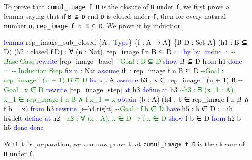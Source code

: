 \documentclass[
  letterpaper,
  DIV=11,
  numbers=noendperiod]{scrreprt}
\newenvironment{Shaded}{\begin{snugshade}}{\end{snugshade}}
\newcommand{\CommentTok}[1]{\textcolor[rgb]{0.37,0.37,0.37}{#1}}
\newcommand{\KeywordTok}[1]{\textcolor[rgb]{0.00,0.23,0.31}{#1}}
\newcommand{\NormalTok}[1]{\textcolor[rgb]{0.00,0.23,0.31}{#1}}
\renewcommand{\NormalTok}[1]{\textcolor[HTML]{000000}{#1}}
\renewcommand{\KeywordTok}[1]{\textcolor[HTML]{0000FF}{#1}}
\renewcommand{\CommentTok}[1]{\textcolor[HTML]{008000}{#1}}
\theoremstyle{remark}
\begin{document}
To prove that \texttt{cumul\_image\ f\ B} is the closure of \texttt{B}
under \texttt{f}, we first prove a lemma saying that if \texttt{B\ ⊆\ D}
and \texttt{D} is closed under \texttt{f}, then for every natural number
\texttt{n}, \texttt{rep\_image\ f\ n\ B\ ⊆\ D}. We prove it by
induction.

\begin{Shaded}
\begin{Highlighting}[]
\KeywordTok{lemma}\NormalTok{ rep\_image\_sub\_closed \{A : }\KeywordTok{Type}\NormalTok{\} \{f : A → A\} \{B D : Set A\}}
\NormalTok{    (h1 : B ⊆ D) (h2 : closed f D) :}
\NormalTok{    ∀ (n : Nat), rep\_image f n B ⊆ D := }\KeywordTok{by}
  \KeywordTok{by\_induc}
\NormalTok{  · }\CommentTok{{-}{-} Base Case}
    \KeywordTok{rewrite}\NormalTok{ [rep\_image\_base]          }\CommentTok{{-}{-}Goal : B ⊆ D}
    \KeywordTok{show}\NormalTok{ B ⊆ D }\KeywordTok{from}\NormalTok{ h1}
    \KeywordTok{done}
\NormalTok{  · }\CommentTok{{-}{-} Induction Step}
    \KeywordTok{fix}\NormalTok{ n : Nat}
    \KeywordTok{assume}\NormalTok{ ih : rep\_image f n B ⊆ D   }\CommentTok{{-}{-}Goal : rep\_image f (n + 1) B ⊆ D}
    \KeywordTok{fix}\NormalTok{ x : A}
    \KeywordTok{assume}\NormalTok{ h3 : x ∈ rep\_image f (n + 1) B  }\CommentTok{{-}{-}Goal : x ∈ D}
    \KeywordTok{rewrite}\NormalTok{ [rep\_image\_step] }\KeywordTok{at}\NormalTok{ h3}
    \KeywordTok{define} \KeywordTok{at}\NormalTok{ h3    }\CommentTok{{-}{-}h3 : ∃ (x\_1 : A), x\_1 ∈ rep\_image f n B ∧ f x\_1 = x}
    \KeywordTok{obtain}\NormalTok{ (b : A) (h4 : b ∈ rep\_image f n B ∧ f b = x) }\KeywordTok{from}\NormalTok{ h3}
    \KeywordTok{rewrite}\NormalTok{ [←h4.right]   }\CommentTok{{-}{-}Goal : f b ∈ D    }
    \KeywordTok{have}\NormalTok{ h5 : b ∈ D := ih h4.left}
    \KeywordTok{define} \KeywordTok{at}\NormalTok{ h2          }\CommentTok{{-}{-}h2 : ∀ (x : A), x ∈ D → f x ∈ D}
    \KeywordTok{show}\NormalTok{ f b ∈ D }\KeywordTok{from}\NormalTok{ h2 b h5}
    \KeywordTok{done}
  \KeywordTok{done}
\end{Highlighting}
\end{Shaded}

With this preparation, we can now prove that \texttt{cumul\_image\ f\ B}
is the closure of \texttt{B} under \texttt{f}.
\end{document}
